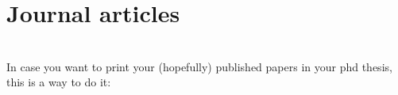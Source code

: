 
\chapter{Journal articles}
\blindtext[5]\\

In case you want to  print your (hopefully) published papers in your phd thesis, this is a way to do it:
            
 